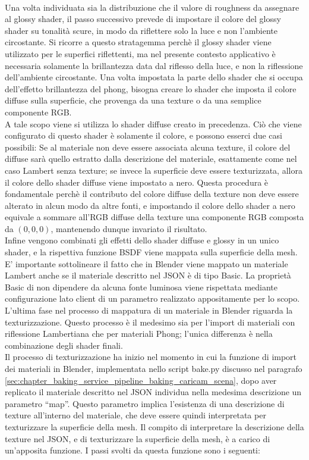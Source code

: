 \\
Una volta individuata sia la distribuzione che il valore di roughness da assegnare al glossy shader, il passo successivo prevede di impostare il colore del glossy shader su tonalità scure, in modo da riflettere solo la luce e non l’ambiente circostante.
Si ricorre a questo stratagemma perchè il glossy shader viene utilizzato per le superfici riflettenti, ma nel presente contesto applicativo è necessaria solamente la brillantezza data dal riflesso della luce, e non la riflessione dell’ambiente circostante. 
Una volta impostata la parte dello shader che si occupa dell’effetto brillantezza del phong, bisogna creare lo shader che imposta il colore diffuse sulla superficie, che provenga da una texture o da una semplice componente RGB.
\\
A tale scopo viene si utilizza lo shader diffuse creato in precedenza. Ciò che viene configurato di questo shader è solamente il colore, e possono esserci due casi possibili:
Se al materiale non deve essere associata alcuna texture, il colore del diffuse sarà quello estratto dalla descrizione del materiale, esattamente come nel caso Lambert senza texture; se invece la superficie deve essere texturizzata, allora il colore dello shader diffuse viene impostato a nero. Questa procedura è fondamentale perchè il contributo del colore diffuse della texture non deve essere alterato in alcun modo da altre fonti, e impostando il colore dello shader a nero equivale a sommare all’RGB diffuse della texture una componente RGB composta da $(0,0,0)$, mantenendo dunque invariato il risultato. 
\\
Infine vengono combinati gli effetti dello shader diffuse e glossy in un unico shader, e la rispettiva funzione BSDF viene mappata sulla superficie della mesh. 
E’ importante sottolineare il fatto che in Blender viene mappato un materiale Lambert anche se il materiale descritto nel JSON è di tipo Basic. La proprietà Basic di non dipendere da alcuna fonte luminosa viene rispettata mediante configurazione lato client di un parametro realizzato appositamente per lo scopo.
\\
L’ultima fase nel processo di mappatura di un materiale in Blender riguarda la texturizzazione.
Questo processo è il medesimo sia per l’import di materiali con riflessione Lambertiana che per materiali Phong; l’unica differenza è nella combinazione degli shader finali. 
\\
Il processo di texturizzazione ha inizio nel momento in cui la funzione di import dei materiali in Blender, implementata nello script bake.py discusso nel paragrafo \ref{sec:chapter_baking_service_pipeline_baking_caricam_scena}, dopo aver replicato il materiale descritto nel JSON individua nella medesima descrizione un parametro “map”. Questo parametro implica l’esistenza di una descrizione di texture all’interno del materiale, che deve essere quindi interpretata per texturizzare la superficie della mesh. Il compito di interpretare la descrizione della texture nel JSON, e di texturizzare la superficie della mesh, è a carico di un’apposita funzione. I passi svolti da questa funzione sono i seguenti: 
